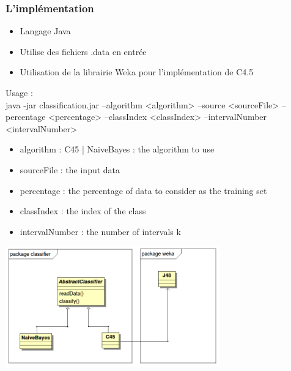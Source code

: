 \begin{frame}
 \frametitle{L'implémentation}

\begin{itemize}
 \item Langage Java
 \item Utilise des fichiers .data en entrée
 \item Utilisation de la librairie Weka pour l'implémentation de C4.5
\end{itemize}
Usage : \\
java -jar classification.jar --algorithm <algorithm> --source <sourceFile> --percentage <percentage> --classIndex <classIndex> --intervalNumber <intervalNumber>
  \begin{itemize}
    \item algorithm : C45 | NaiveBayes : the algorithm to use 
    \item sourceFile : the input data
    \item percentage : the percentage of data to consider as the training set
    \item classIndex : the index of the class
	\item intervalNumber : the number of intervals k
  \end{itemize}
\end{frame}

 \begin{frame}%
 \begin{center}

\includegraphics[width=350px]{classDiagram.png}
\end{center}



\end{frame}
 